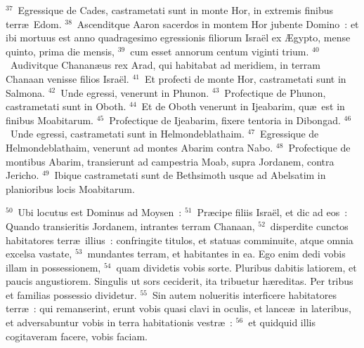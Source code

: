 ${}^{37}$~Egressique de Cades, castrametati sunt in monte Hor, in extremis finibus terr\ae\ Edom.
${}^{38}$~Ascenditque Aaron sacerdos in montem Hor jubente Domino~: et ibi mortuus est anno quadragesimo egressionis filiorum Isra\"el ex \AE gypto, mense quinto, prima die mensis,
${}^{39}$~cum esset annorum centum viginti trium.
${}^{40}$~Audivitque Chanan\ae us rex Arad, qui habitabat ad meridiem, in terram Chanaan venisse filios Isra\"el.
${}^{41}$~Et profecti de monte Hor, castrametati sunt in Salmona.
${}^{42}$~Unde egressi, venerunt in Phunon.
${}^{43}$~Profectique de Phunon, castrametati sunt in Oboth.
${}^{44}$~Et de Oboth venerunt in Ijeabarim, qu\ae\ est in finibus Moabitarum.
${}^{45}$~Profectique de Ijeabarim, fixere tentoria in Dibongad.
${}^{46}$~Unde egressi, castrametati sunt in Helmondeblathaim.
${}^{47}$~Egressique de Helmondeblathaim, venerunt ad montes Abarim contra Nabo.
${}^{48}$~Profectique de montibus Abarim, transierunt ad campestria Moab, supra Jordanem, contra Jericho.
${}^{49}$~Ibique castrametati sunt de Bethsimoth usque ad Abelsatim in planioribus locis Moabitarum.


${}^{50}$~Ubi locutus est Dominus ad Moysen~:
${}^{51}$~Pr\ae cipe filiis Isra\"el, et dic ad eos~: Quando transieritis Jordanem, intrantes terram Chanaan,
${}^{52}$~disperdite cunctos habitatores terr\ae\ illius~: confringite titulos, et statuas comminuite, atque omnia excelsa vastate,
${}^{53}$~mundantes terram, et habitantes in ea. Ego enim dedi vobis illam in possessionem,
${}^{54}$~quam dividetis vobis sorte. Pluribus dabitis latiorem, et paucis angustiorem. Singulis ut sors ceciderit, ita tribuetur h\ae reditas. Per tribus et familias possessio dividetur.
${}^{55}$~Sin autem nolueritis interficere habitatores terr\ae~: qui remanserint, erunt vobis quasi clavi in oculis, et lance\ae\ in lateribus, et adversabuntur vobis in terra habitationis vestr\ae~:
${}^{56}$~et quidquid illis cogitaveram facere, vobis faciam.

